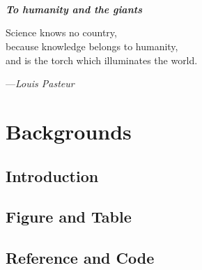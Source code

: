 \documentclass[12pt]{report}
\begin{document}
\clearpage

~ \\ ~ \\ ~ \\
\begin{center}
\textbf{\textit{
To humanity and the giants
}}
\end{center}

\mbox{}
\vfill
{\noindent Science knows no country, \\ because knowledge belongs to humanity, \\ and is the torch which illuminates the world.}

{\footnotesize
}

\hfill ---\textit{Louis Pasteur}
\clearpage


\part{Backgrounds}\label{part-bkg}

\chapter{Introduction}\label{c:intro}



\chapter{Figure and Table}


\chapter{Reference and Code}

\end{document}
